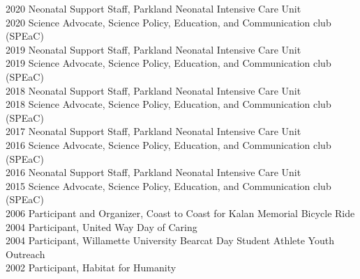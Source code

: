 2020 \hspace{58pt} Neonatal Support Staff, Parkland Neonatal Intensive Care Unit \\
2020 \hspace{58pt} Science Advocate, Science Policy, Education, and Communication club (SPEaC) \\
2019 \hspace{58pt} Neonatal Support Staff, Parkland Neonatal Intensive Care Unit \\
2019 \hspace{58pt} Science Advocate, Science Policy, Education, and Communication club (SPEaC) \\
2018 \hspace{58pt} Neonatal Support Staff, Parkland Neonatal Intensive Care Unit \\
2018 \hspace{58pt} Science Advocate, Science Policy, Education, and Communication club (SPEaC) \\
2017 \hspace{58pt} Neonatal Support Staff, Parkland Neonatal Intensive Care Unit \\
2016 \hspace{58pt} Science Advocate, Science Policy, Education, and Communication club (SPEaC) \\
2016 \hspace{58pt} Neonatal Support Staff, Parkland Neonatal Intensive Care Unit \\
2015 \hspace{58pt} Science Advocate, Science Policy, Education, and Communication club (SPEaC) \\
2006 \hspace{58pt} Participant and Organizer, Coast to Coast for Kalan Memorial Bicycle Ride \\
2004 \hspace{58pt} Participant, United Way Day of Caring \\
2004 \hspace{58pt} Participant, Willamette University Bearcat Day Student Athlete Youth Outreach \\
2002 \hspace{58pt} Participant, Habitat for Humanity \\

